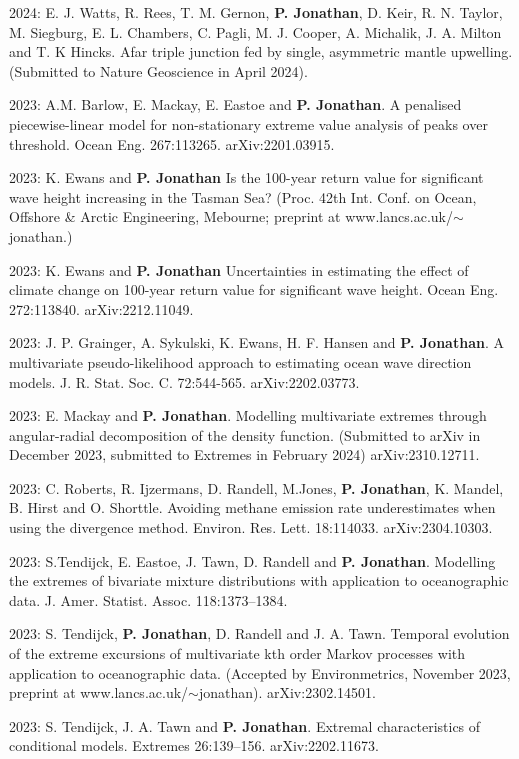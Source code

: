 \documentclass[11pt,a4paper]{moderncv}
\begin{document}
2024: E. J. Watts, R. Rees, T. M. Gernon, \textbf{P. Jonathan}, D. Keir, R. N. Taylor, M. Siegburg, E. L. Chambers, C. Pagli, M. J. Cooper, A. Michalik, J. A. Milton and T. K Hincks. Afar triple junction fed by single, asymmetric mantle upwelling. (Submitted to Nature Geoscience in April 2024).

2023:  A.M. Barlow, E. Mackay, E. Eastoe and \textbf{P. Jonathan}. A penalised piecewise-linear model for non-stationary extreme value analysis of peaks over threshold. Ocean Eng. 267:113265. arXiv:2201.03915.

2023: K. Ewans and \textbf{P. Jonathan} Is the 100-year return value for significant wave height increasing in the Tasman Sea? (Proc. 42th Int. Conf. on Ocean, Offshore \& Arctic Engineering, Mebourne; preprint at  www.lancs.ac.uk/$\sim$jonathan.)

2023: K. Ewans and \textbf{P. Jonathan} Uncertainties in estimating the effect of climate change on 100-year return value for significant wave height. Ocean Eng. 272:113840. arXiv:2212.11049.

2023: J. P. Grainger, A. Sykulski, K. Ewans, H. F. Hansen and \textbf{P. Jonathan}. A multivariate pseudo-likelihood approach to estimating ocean wave direction models. J. R. Stat. Soc. C. 72:544-565.  arXiv:2202.03773.

2023: E. Mackay and \textbf{P. Jonathan}. Modelling multivariate extremes through angular-radial decomposition of the density function. (Submitted to arXiv in December 2023, submitted to Extremes in February 2024) arXiv:2310.12711.

2023: C. Roberts, R. Ijzermans, D. Randell, M.Jones, \textbf{P. Jonathan}, K. Mandel, B. Hirst and O. Shorttle. Avoiding methane emission rate underestimates when using the divergence method. Environ. Res. Lett. 18:114033. arXiv:2304.10303.

2023: S.Tendijck, E. Eastoe, J. Tawn, D. Randell and \textbf{P. Jonathan}. Modelling the extremes of bivariate mixture distributions with application to oceanographic data. J. Amer. Statist. Assoc. 118:1373--1384.

2023: S. Tendijck, \textbf{P. Jonathan}, D. Randell and J. A. Tawn. Temporal evolution of the extreme excursions of multivariate kth order Markov processes with application to oceanographic data. (Accepted by Environmetrics, November 2023, preprint at www.lancs.ac.uk/$\sim$jonathan). arXiv:2302.14501.

2023: S. Tendijck, J. A. Tawn and \textbf{P. Jonathan}. Extremal characteristics of conditional models. Extremes 26:139–156. arXiv:2202.11673.
\end{document}
